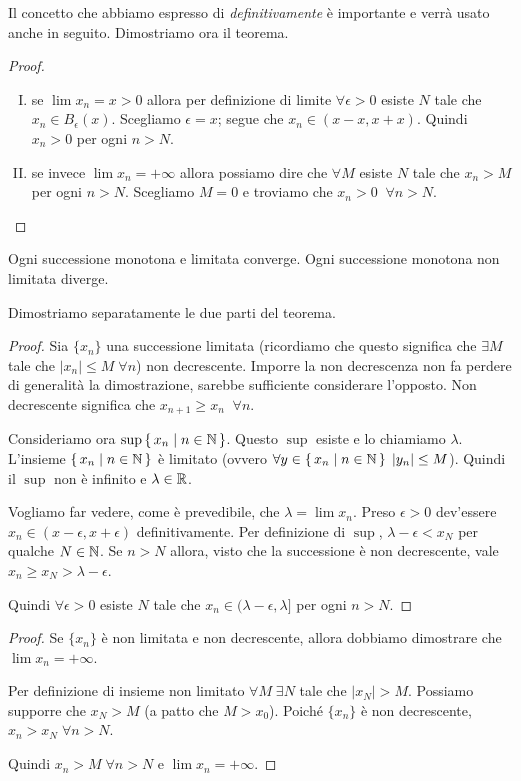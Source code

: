 Il concetto che abbiamo espresso di \emph{definitivamente} è importante e verrà usato anche in seguito. Dimostriamo ora il teorema.

\begin{proof} \hfill
\begin{enumerate}[I.]
\item se $\lim x_n = x > 0$ allora per definizione di limite $\forall \epsilon > 0$ esiste $N$ tale che $x_n \in B_{\epsilon}(x)$. Scegliamo $\epsilon = x$; segue che $x_n \in (x-x, x+x)$. Quindi $x_n > 0$ per ogni $n > N$.
\item se invece $\lim x_n = +\infty$ allora possiamo dire che $\forall M$ esiste $N$ tale che $x_n > M$ per ogni $n > N$. Scegliamo $M = 0$ e troviamo che $x_n > 0 \; \; \forall n > N$.
\end{enumerate}
\end{proof}

\begin{theorem}
Ogni successione monotona e limitata converge. Ogni successione monotona non limitata diverge. 
\end{theorem}

Dimostriamo separatamente le due parti del teorema.

\begin{proof}
Sia $\{x_n\}$ una successione limitata (ricordiamo che questo significa che $\exists M$ tale che $|x_n| \le M \; \forall n$) non decrescente. Imporre la non decrescenza non fa perdere di generalità la dimostrazione, sarebbe sufficiente considerare l'opposto. Non decrescente significa che $x_{n+1} \ge x_n \;\; \forall n$.

Consideriamo ora $\sup \set{x_n | n \in \mathbb N}$. Questo $\sup$ esiste e lo chiamiamo $\lambda$. L'insieme $\set{x_n | n \in \mathbb N}$ è limitato (ovvero $\forall y \in \set{x_n | n \in \mathbb N} \; |y_n| \le M$). Quindi il $\sup$ non è infinito e $\lambda \in \mathbb R$.

Vogliamo far vedere, come è prevedibile, che $\lambda = \lim x_n$. Preso $\epsilon > 0$ dev'essere $x_n \in (x-\epsilon, x+\epsilon)$ definitivamente. Per definizione di $\sup$, $\lambda - \epsilon < x_N$ per qualche $N \in \mathbb N$. Se $n > N$ allora, visto che la successione è non decrescente, vale $x_n \ge x_N > \lambda - \epsilon$.

Quindi $\forall \epsilon > 0$ esiste $N$ tale che $x_n \in (\lambda - \epsilon, \lambda]$ per ogni $n > N$.
\end{proof}

\begin{proof}
Se $\{x_n\}$ è non limitata e non decrescente, allora dobbiamo dimostrare che $\lim x_n = +\infty$.

Per definizione di insieme non limitato $\forall M \; \exists N$ tale che $|x_N|>M$. Possiamo supporre che $x_N > M$ (a patto che $M > x_0$). Poiché $\{x_n\}$ è non decrescente, $x_n > x_N \; \forall n > N$.

Quindi $x_n > M \; \forall n > N$ e $\lim x_n = +\infty$.
\end{proof}

